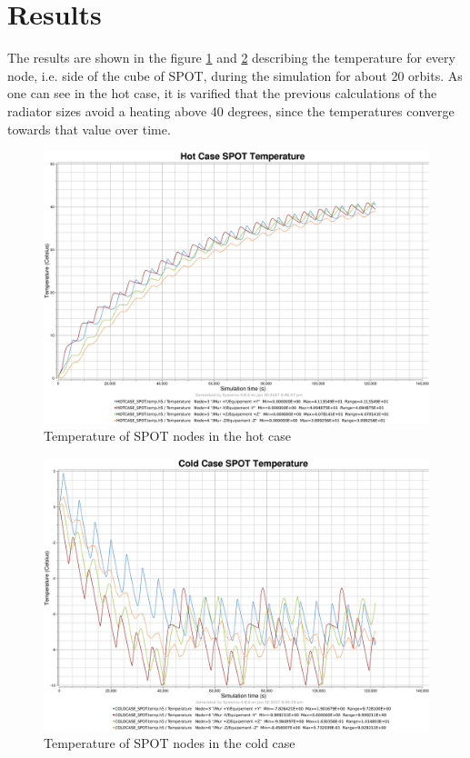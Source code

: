 \section{Results}
The results are shown in the figure \ref{fig:spothot} and \ref{fig:spotcold} describing the temperature for every node, i.e. side of the cube of SPOT, during the simulation for about 20 orbits. As one can see in the hot case, it is varified that the previous calculations of the radiator sizes avoid a heating above 40 degrees, since the temperatures converge towards that value over time. 
\begin{figure}[H]
	\centering
	\includegraphics[scale=0.15]{images/SPOT_hotcase_temperature.png}
	\caption{Temperature of SPOT nodes in the hot case}
	\label{fig:spothot}
\end{figure}

\begin{figure}[H]
	\centering
	\includegraphics[scale=0.15]{images/SPOT_coldcase_temperature.png}
	\caption{Temperature of SPOT nodes in the cold case}
	\label{fig:spotcold}
\end{figure}


